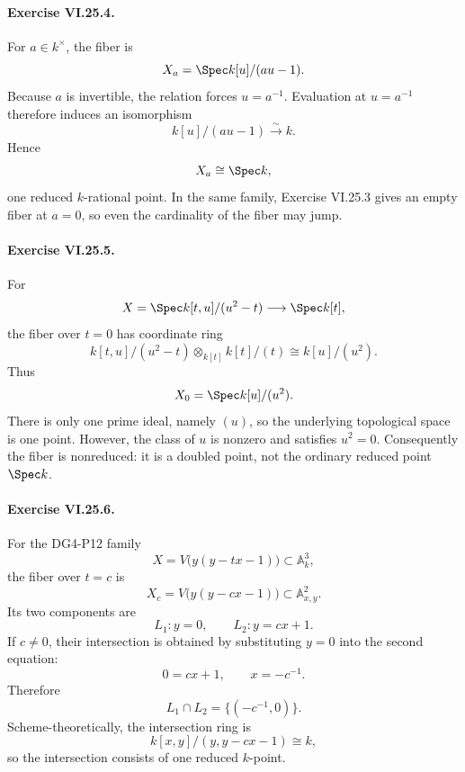 \paragraph{Exercise VI.25.4.}
\begin{solution}
For \(a\in k^\times\), the fiber is
\[
X_a
=
\Spec k[u]/(au-1).
\]
Because \(a\) is invertible, the relation forces \(u=a^{-1}\).  Evaluation at \(u=a^{-1}\) therefore induces an isomorphism
\[
k[u]/(au-1)\xrightarrow{\sim}k.
\]
Hence
\[
X_a\cong\Spec k,
\]
one reduced \(k\)-rational point.  In the same family, Exercise VI.25.3 gives an empty fiber at \(a=0\), so even the cardinality of the fiber may jump.
\end{solution}

\paragraph{Exercise VI.25.5.}
\begin{solution}
For
\[
X=\Spec k[t,u]/(u^2-t)\longrightarrow\Spec k[t],
\]
the fiber over \(t=0\) has coordinate ring
\[
k[t,u]/(u^2-t)\otimes_{k[t]}k[t]/(t)
\cong
k[u]/(u^2).
\]
Thus
\[
X_0=\Spec k[u]/(u^2).
\]
There is only one prime ideal, namely \((u)\), so the underlying topological space is one point.  However, the class of \(u\) is nonzero and satisfies \(u^2=0\).  Consequently the fiber is nonreduced: it is a doubled point, not the ordinary reduced point \(\Spec k\).
\end{solution}

\paragraph{Exercise VI.25.6.}
\begin{solution}
For the DG4-P12 family
\[
X=V\bigl(y(y-tx-1)\bigr)\subset\mathbb A^3_k,
\]
the fiber over \(t=c\) is
\[
X_c=V\bigl(y(y-cx-1)\bigr)\subset\mathbb A^2_{x,y}.
\]
Its two components are
\[
L_1: y=0,\qquad L_2:y=cx+1.
\]
If \(c\ne0\), their intersection is obtained by substituting \(y=0\) into the second equation:
\[
0=cx+1,
\qquad
x=-c^{-1}.
\]
Therefore
\[
L_1\cap L_2=\{(-c^{-1},0)\}.
\]
Scheme-theoretically, the intersection ring is
\[
k[x,y]/(y,y-cx-1)\cong k,
\]
so the intersection consists of one reduced \(k\)-point.
\end{solution}

